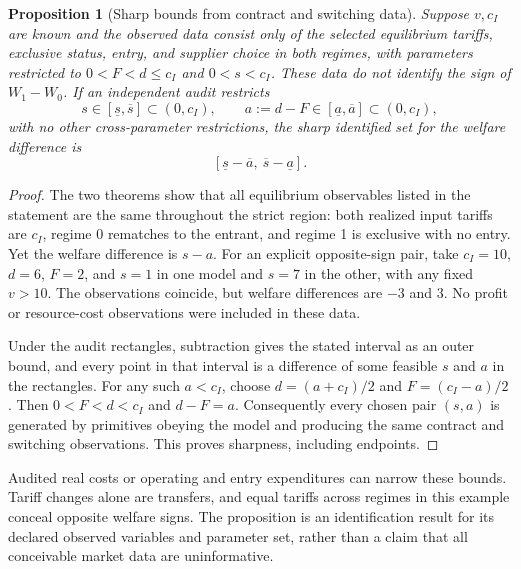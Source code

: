 \documentclass[11pt]{article}
\newtheorem{proposition}[theorem]{Proposition}
\theoremstyle{remark}
\begin{document}
\begin{proposition}[Sharp bounds from contract and switching data]
Suppose $v,c_I$ are known and the observed data consist only of the
selected equilibrium tariffs, exclusive status, entry, and supplier
choice in both regimes, with parameters restricted to $0<F<d\leq c_I$
and $0<s<c_I$. These data do not identify the sign of $W_1-W_0$.
If an independent audit restricts
\[
 s\in[\underline s,\overline s]\subset(0,c_I),\qquad
 a:=d-F\in[\underline a,\overline a]\subset(0,c_I),
\]
with no other cross-parameter restrictions, the sharp identified set
for the welfare difference is
\[
 [\underline s-\overline a,\ \overline s-\underline a].
\]
\end{proposition}
\begin{proof}
The two theorems show that all equilibrium observables listed in the
statement are the same throughout the strict region: both realized
input tariffs are $c_I$, regime 0 rematches to the entrant, and regime 1
is exclusive with no entry. Yet the welfare difference is $s-a$.
For an explicit opposite-sign pair, take $c_I=10$, $d=6$, $F=2$,
and $s=1$ in one model and $s=7$ in the other, with any fixed $v>10$.
The observations coincide, but welfare differences are $-3$ and $3$.
No profit or resource-cost observations were included in these data.

Under the audit rectangles, subtraction gives the stated interval as
an outer bound, and every point in that interval is a difference of
some feasible $s$ and $a$ in the rectangles. For any such $a<c_I$,
choose $d=(a+c_I)/2$ and $F=(c_I-a)/2$. Then $0<F<d<c_I$ and
$d-F=a$. Consequently every chosen pair $(s,a)$ is generated by
primitives obeying the model and producing the same contract and
switching observations. This proves sharpness, including endpoints.
\end{proof}

Audited real costs or operating and entry expenditures can narrow these
bounds. Tariff changes alone are transfers, and equal tariffs across
regimes in this example conceal opposite welfare signs. The proposition
is an identification result for its declared observed variables and
parameter set, rather than a claim that all conceivable market data
are uninformative.
\end{document}
